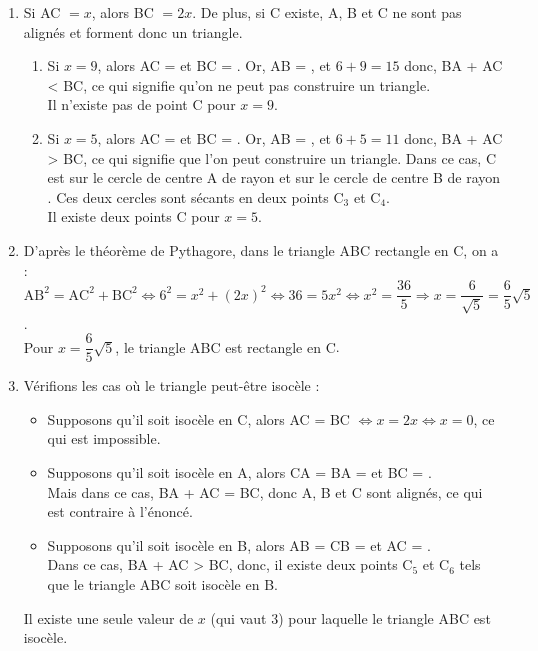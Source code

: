 \begin{enumerate}
\begin{enumerate}
         \end{enumerate}
      \setcounter{enumi}{1}
      \item Si AC $=x$, alors BC $=2x$. De plus, si C existe, A, B et C ne sont pas alignés et forment donc un triangle.
         \begin{enumerate}
            \item Si $x=9$, alors AC =  et BC = . Or, AB = , et $6+9 =15$ donc, BA + AC < BC, ce qui signifie qu'on ne peut pas construire un triangle. \\
            {\blue Il n'existe pas de point C pour $x=9$}.
            \item Si $x=5$, alors AC =  et BC = . Or, AB = , et $6+5 =11$ donc, BA + AC > BC, ce qui signifie que l'on peut construire un triangle. Dans ce cas, C est sur le cercle de centre A de rayon  et sur le cercle de centre B de rayon . Ces deux cercles sont sécants en deux points C$_3$ et C$_4$. \\
            {\blue Il existe deux points C pour $x=5$}.
         \end{enumerate}
      \setcounter{enumi}{2}
      \item D'après le théorème de Pythagore, dans le triangle ABC rectangle en C, on a : \\
         $\text{AB}^2 =\text{AC}^2+\text{BC}^2 \iff 6^2 =x^2+(2x)^2 \iff 36 =5x^2 \iff x^2 =\dfrac{36}{5} \Longrightarrow x=\dfrac{6}{\sqrt5} =\dfrac{6}{5}\sqrt5$. \\
         {\blue Pour $x=\dfrac65\sqrt5$, le triangle ABC est rectangle en C}. \smallskip
       \item Vérifions les cas où le triangle peut-être isocèle :
          \begin{itemize}
            \item Supposons qu'il soit isocèle en C, alors AC = BC $\iff x =2x \iff x=0$, ce qui est impossible.
            \item Supposons qu'il soit isocèle en A, alors CA = BA =  et BC = . \\
               Mais dans ce cas, BA + AC = BC, donc A, B et C sont alignés, ce qui est contraire à l'énoncé.
             \item Supposons qu'il soit isocèle en B, alors AB = CB =  et AC = . \\
               Dans ce cas, BA + AC > BC, donc, il existe deux points C$_5$ et C$_6$ tels que le triangle ABC soit isocèle en B.
          \end{itemize}
         {\blue Il existe une seule valeur de $x$ (qui vaut 3) pour laquelle le triangle ABC est isocèle}.
   \end{enumerate}
